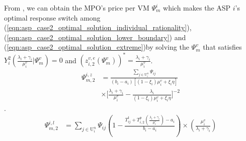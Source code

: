 \documentclass[conference]{IEEEtran}
\begin{document}
From , we can obtain the MPO's price per VM $\Psi_m^i$ which makes the ASP $i$'s optimal response switch among (\ref{eqn:asp_case2_optimal_solution_individual_rationality}), (\ref{eqn:asp_case2_optimal_solution_lower_boundary}) and (\ref{eqn:asp_case2_optimal_solution_extreme})by solving the $\Psi_m^v$ that satisfies $Y_i^2(\frac{\lambda_i+\gamma_i}{\mu_i^v}|\Psi_m^v) = 0$ and $(z_{i,2}^{v,e}(\Psi_m^v))^* = \frac{\lambda_i+\gamma_i}{\mu_i^v}$.
\begin{equation}
\begin{aligned}
\Psi_{m,2}^{i,z}&= \frac{\sum_{j \in \mathrm{U}_i^n}\Psi_{ij}}{(b_i-a_i)[(1-\xi_i)\mu_i^v + \xi_i \eta]} \\
& \times \big[\frac{\lambda_i+\gamma_i}{\mu_i^v} - \frac{\lambda_i}{(1-\xi_i)\mu_i^v + \xi_i\eta}\big]^{-2}
\end{aligned}
\end{equation}.
\begin{equation}
\begin{aligned}
\Psi_{m,2}^{i,l}&= \sum_{j \in \mathrm{U}_i^n}\Psi_{ij}(1-\frac{T_{ij}^t + T_{i,2}^p(\frac{\lambda_i+\gamma_i}{\mu_i^v})-a_i}{b_i-a_i})\times(\frac{\mu_i^v}{\lambda_i+\gamma_i})
\end{aligned}
\end{equation}

\end{document}
